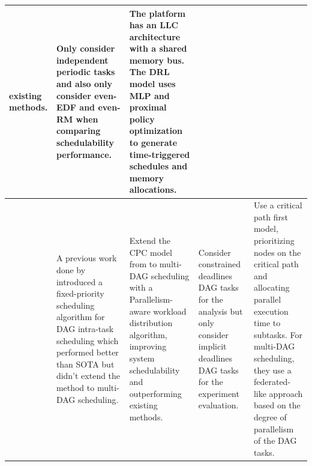 \begin{table}
\begin{tabular}[]{|p{0.15in}|p{1.6in}|p{1.6in}|p{1.6in}|p{1.6in}|}
        existing methods. & Only consider independent periodic tasks
        and also only consider even-EDF and even-RM when comparing schedulability performance. &
        The platform has an LLC architecture with a shared memory bus. The DRL model uses MLP and proximal 
        policy optimization to generate time-triggered schedules and memory allocations.\\
        \hline
        \cite{Zhao2022DAGsched} & A previous work done by \citet{zhao2020DAGsched} introduced a fixed-priority scheduling 
        algorithm for DAG intra-task scheduling which performed better 
        than SOTA but didn't extend the method to multi-DAG scheduling. & 
        Extend the CPC model from \citet{zhao2020DAGsched} to multi-DAG scheduling with a Parallelism-aware workload distribution algorithm, improving system schedulability and outperforming existing methods. & 
        Consider constrained deadlines DAG tasks for the analysis
        but only consider implicit deadlines DAG tasks for the experiment evaluation. & Use a critical path first model, prioritizing nodes on the critical 
        path and allocating parallel execution time to subtasks. For multi-DAG scheduling, they use a federated-like approach based on the degree of parallelism of the DAG tasks.  \\
        \hline
    \end{tabular}
\end{table}
